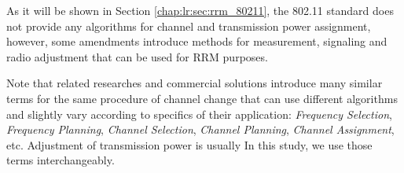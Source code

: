 As it will be shown in Section \ref{chap:lr:sec:rrm_80211}, the 802.11 standard does not provide any algorithms for channel and transmission power assignment, however, some amendments introduce methods for measurement, signaling and radio adjustment that can be used for RRM purposes.

Note that related researches and commercial solutions introduce many similar terms for the same procedure of channel change that can use different algorithms and slightly vary according to specifics of their application: \textit{Frequency Selection}, \textit{Frequency Planning}, \textit{Channel Selection}, \textit{Channel Planning}, \textit{Channel Assignment}, etc. Adjustment of transmission power is usually
In this study, we use those terms interchangeably.